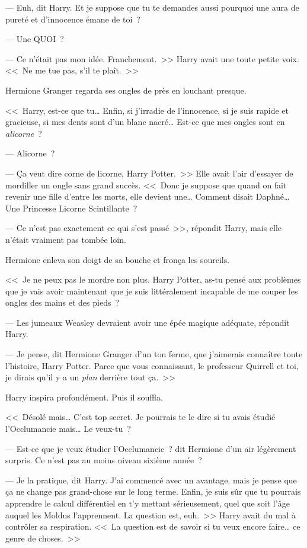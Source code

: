 --- Euh, dit Harry. Et je suppose que tu te demandes aussi pourquoi une aura de pureté et d'innocence émane de toi~?

--- Une QUOI~?

--- Ce n'était pas mon idée. Franchement.~>> Harry avait une toute petite voix. <<~Ne me tue pas, s'il te plaît.~>>

Hermione Granger regarda ses ongles de près en louchant presque.

<<~Harry, est-ce que tu… Enfin, si j'irradie de l'innocence, si je suis rapide et gracieuse, si mes dents sont d'un blanc nacré… Est-ce que mes ongles sont en \emph{alicorne}~?

--- Alicorne~?

--- Ça veut dire corne de licorne, Harry Potter.~>> Elle avait l'air d'essayer de mordiller un ongle sans grand succès. <<~Donc je suppose que quand on fait revenir une fille d'entre les morts, elle devient une… Comment disait Daphné… Une Princesse Licorne Scintillante~?

--- Ce n'est pas exactement ce qui s'est passé~>>, répondit Harry, mais elle n'était vraiment pas tombée loin.

Hermione enleva son doigt de sa bouche et fronça les sourcils.

<<~Je ne peux pas le mordre non plus. Harry Potter, as-tu pensé aux problèmes que je vais avoir maintenant que je suis littéralement incapable de me couper les ongles des mains et des pieds~?

--- Les jumeaux Weasley devraient avoir une épée magique adéquate, répondit Harry.

--- Je pense, dit Hermione Granger d'un ton ferme, que j'aimerais connaître toute l'histoire, Harry Potter. Parce que vous connaissant, le professeur Quirrell et toi, je dirais qu'il y a un \emph{plan} derrière tout ça.~>>

Harry inspira profondément. Puis il souffla.

<<~Désolé mais… C'est top secret. Je pourrais te le dire si tu avais étudié l'Occlumancie mais… Le veux-tu~?

--- Est-ce que je veux étudier l'Occlumancie~? dit Hermione d'un air légèrement surpris. Ce n'est pas au moins niveau sixième année~?

--- Je la pratique, dit Harry. J'ai commencé avec un avantage, mais je pense que ça ne change pas grand-chose sur le long terme. Enfin, je suis sûr que tu pourrais apprendre le calcul différentiel en t'y mettant sérieusement, quel que soit l'âge auquel les Moldus l'apprennent. La question est, euh.~>> Harry avait du mal à contrôler sa respiration. <<~La question est de savoir si tu veux encore faire… ce genre de choses.~>>


